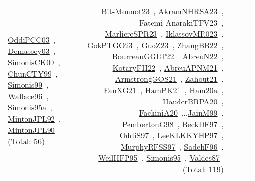 {\begin{longtable}{p{3cm}r>{\raggedright\arraybackslash}p{6cm}>{\raggedright\arraybackslash}p{6cm}>{\raggedright\arraybackslash}p{8cm}}
\href{../works/OddiPCC03.pdf}{OddiPCC03}~\cite{OddiPCC03}, \href{../works/Demassey03.pdf}{Demassey03}~\cite{Demassey03}, \href{../works/SimonisCK00.pdf}{SimonisCK00}~\cite{SimonisCK00}, \href{../works/ChunCTY99.pdf}{ChunCTY99}~\cite{ChunCTY99}, \href{../works/Simonis99.pdf}{Simonis99}~\cite{Simonis99}, \href{../works/Wallace96.pdf}{Wallace96}~\cite{Wallace96}, \href{../works/Simonis95a.pdf}{Simonis95a}~\cite{Simonis95a}, \href{../works/MintonJPL92.pdf}{MintonJPL92}~\cite{MintonJPL92}, \href{../works/MintonJPL90.pdf}{MintonJPL90}~\cite{MintonJPL90} (Total: 56) & \href{../works/Bit-Monnot23.pdf}{Bit-Monnot23}~\cite{Bit-Monnot23}, \href{../works/AkramNHRSA23.pdf}{AkramNHRSA23}~\cite{AkramNHRSA23}, \href{../works/Fatemi-AnarakiTFV23.pdf}{Fatemi-AnarakiTFV23}~\cite{Fatemi-AnarakiTFV23}, \href{../works/MarliereSPR23.pdf}{MarliereSPR23}~\cite{MarliereSPR23}, \href{../works/IklassovMR023.pdf}{IklassovMR023}~\cite{IklassovMR023}, \href{../works/GokPTGO23.pdf}{GokPTGO23}~\cite{GokPTGO23}, \href{../works/GuoZ23.pdf}{GuoZ23}~\cite{GuoZ23}, \href{../works/ZhangBB22.pdf}{ZhangBB22}~\cite{ZhangBB22}, \href{../works/BourreauGGLT22.pdf}{BourreauGGLT22}~\cite{BourreauGGLT22}, \href{../works/AbreuN22.pdf}{AbreuN22}~\cite{AbreuN22}, \href{../works/KotaryFH22.pdf}{KotaryFH22}~\cite{KotaryFH22}, \href{../works/AbreuAPNM21.pdf}{AbreuAPNM21}~\cite{AbreuAPNM21}, \href{../works/ArmstrongGOS21.pdf}{ArmstrongGOS21}~\cite{ArmstrongGOS21}, \href{../works/Zahout21.pdf}{Zahout21}~\cite{Zahout21}, \href{../works/FanXG21.pdf}{FanXG21}~\cite{FanXG21}, \href{../works/HamPK21.pdf}{HamPK21}~\cite{HamPK21}, \href{../works/Ham20a.pdf}{Ham20a}~\cite{Ham20a}, \href{../works/HauderBRPA20.pdf}{HauderBRPA20}~\cite{HauderBRPA20}, \href{../works/FachiniA20.pdf}{FachiniA20}~\cite{FachiniA20}...\href{../works/JainM99.pdf}{JainM99}~\cite{JainM99}, \href{../works/PembertonG98.pdf}{PembertonG98}~\cite{PembertonG98}, \href{../works/BeckDF97.pdf}{BeckDF97}~\cite{BeckDF97}, \href{../works/OddiS97.pdf}{OddiS97}~\cite{OddiS97}, \href{../works/LeeKLKKYHP97.pdf}{LeeKLKKYHP97}~\cite{LeeKLKKYHP97}, \href{../works/MurphyRFSS97.pdf}{MurphyRFSS97}~\cite{MurphyRFSS97}, \href{../works/SadehF96.pdf}{SadehF96}~\cite{SadehF96}, \href{../works/WeilHFP95.pdf}{WeilHFP95}~\cite{WeilHFP95}, \href{../works/Simonis95.pdf}{Simonis95}~\cite{Simonis95}, \href{../works/Valdes87.pdf}{Valdes87}~\cite{Valdes87} (Total: 119)\\

\end{longtable}}
